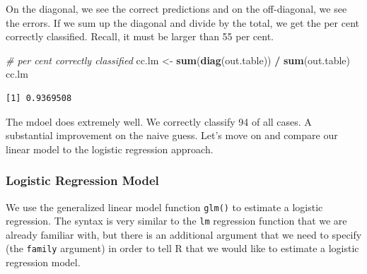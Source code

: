 \documentclass[]{article}
\newenvironment{Shaded}{\begin{snugshade}}{\end{snugshade}}
\newcommand{\KeywordTok}[1]{\textcolor[rgb]{0.13,0.29,0.53}{\textbf{#1}}}
\newcommand{\StringTok}[1]{\textcolor[rgb]{0.31,0.60,0.02}{#1}}
\newcommand{\CommentTok}[1]{\textcolor[rgb]{0.56,0.35,0.01}{\textit{#1}}}
\newcommand{\OperatorTok}[1]{\textcolor[rgb]{0.81,0.36,0.00}{\textbf{#1}}}
\newcommand{\NormalTok}[1]{#1}
\theoremstyle{definition}
\theoremstyle{definition}
\theoremstyle{definition}
\theoremstyle{remark}
\begin{document}
On the diagonal, we see the correct predictions and on the off-diagonal,
we see the errors. If we sum up the diagonal and divide by the total, we
get the per cent correctly classified. Recall, it must be larger than 55
per cent.

\begin{Shaded}
\begin{Highlighting}[]
\CommentTok{# per cent correctly classified}
\NormalTok{cc.lm <-}\StringTok{ }\KeywordTok{sum}\NormalTok{(}\KeywordTok{diag}\NormalTok{(out.table)) }\OperatorTok{/}\StringTok{ }\KeywordTok{sum}\NormalTok{(out.table)}
\NormalTok{cc.lm}
\end{Highlighting}
\end{Shaded}

\begin{verbatim}
[1] 0.9369508
\end{verbatim}

The mdoel does extremely well. We correctly classify 94 of all cases. A
substantial improvement on the naive guess. Let's move on and compare
our linear model to the logistic regression approach.

\subsubsection{Logistic Regression
Model}\label{logistic-regression-model}

We use the generalized linear model function \texttt{glm()} to estimate
a logistic regression. The syntax is very similar to the \texttt{lm}
regression function that we are already familiar with, but there is an
additional argument that we need to specify (the \texttt{family}
argument) in order to tell R that we would like to estimate a logistic
regression model.
\end{document}
